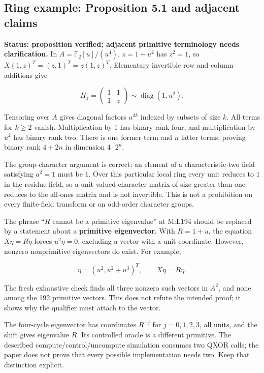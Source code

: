 \documentclass[
  11pt,
]{article}
\begin{document}
\subsection{Ring example: Proposition 5.1 and adjacent
claims}\label{ring-example-proposition-5.1-and-adjacent-claims}

\textbf{Status: proposition verified; adjacent primitive terminology
needs clarification.} In \(A=\mathbb F_2[u]/(u^4)\), \(z=1+u^2\) has
\(z^2=1\), so \(X(1,z)^T=(z,1)^T=z(1,z)^T\). Elementary invertible row
and column additions give

\[
H_z=\begin{pmatrix}1&1\\1&z\end{pmatrix}
\sim\operatorname{diag}(1,u^2).
\]

Tensoring over \(A\) gives diagonal factors \(u^{2k}\) indexed by
subsets of size \(k\). All terms for \(k\ge2\) vanish. Multiplication by
\(1\) has binary rank four, and multiplication by \(u^2\) has binary
rank two. There is one former term and \(n\) latter terms, proving
binary rank \(4+2n\) in dimension \(4\cdot2^n\).

The group-character argument is correct: an element of a
characteristic-two field satisfying \(a^2=1\) must be \(1\). Over this
particular local ring every unit reduces to \(1\) in the residue field,
so a unit-valued character matrix of size greater than one reduces to
the all-ones matrix and is not invertible. This is not a prohibition on
every finite-field transform or on odd-order character groups.

The phrase ``\(R\) cannot be a primitive eigenvalue'' at M:L194 should
be replaced by a statement about a \textbf{primitive eigenvector}. With
\(R=1+u\), the equation \(X\eta=R\eta\) forces \(u^2\eta=0\), excluding
a vector with a unit coordinate. However, nonzero nonprimitive
eigenvectors do exist. For example,

\[
\eta=(u^2,u^2+u^3)^T,\qquad X\eta=R\eta.
\]

The fresh exhaustive check finds all three nonzero such vectors in
\(A^2\), and none among the 192 primitive vectors. This does not refute
the intended proof; it shows why the qualifier must attach to the
vector.

The four-cycle eigenvector has coordinates \(R^{-j}\) for \(j=0,1,2,3\),
all units, and the shift gives eigenvalue \(R\). Its controlled oracle
is a different primitive. The described compute/control/uncompute
simulation consumes two QXOR calls; the paper does not prove that every
possible implementation needs two. Keep that distinction explicit.
\end{document}
